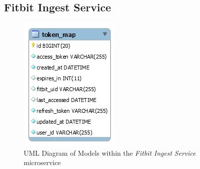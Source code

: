 \subsection{Fitbit Ingest Service}
\begin{figure}[H]
    \centering
    \includegraphics[width=\textwidth]{Images/db_uml/fitbit-ingest-service.png}
    \caption{UML Diagram of Models within the \textit{Fitbit Ingest Service} microservice}
    \label{fig:db_uml:fitbit-ingest-service}
\end{figure}

